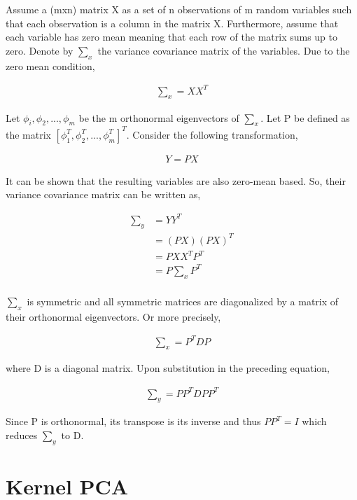 \documentclass[11pt, a4paper]{article}
\begin{document}
Assume a (mxn) matrix X as a set of n observations of m random variables such that each observation is a column in the matrix X. Furthermore, assume that each variable has zero mean meaning that each row of the matrix sums up to zero. Denote by $\sum_x$ the variance covariance matrix of the variables. Due to the zero mean condition, 

\begin{align*}
	\sum_x = XX^T 
\end{align*} 

Let $\phi_i, \phi_2, ..., \phi_m$ be the m orthonormal eigenvectors of $\sum_x$. Let P be defined as the matrix $[\phi_1^T, \phi_2^T, ..., \phi_m^T]^T$. Consider the following transformation, 

\begin{align*}
	Y = PX 
\end{align*}

It can be shown that the resulting variables are also zero-mean based. So, their variance covariance matrix can be written as,

\begin{align*}
	\sum_y & = YY^T       \\
	       & = (PX)(PX)^T \\
	       & = PXX^TP^T   \\
	       & = P\sum_xP^T \\           
\end{align*}

$\sum_x$ is symmetric and all symmetric matrices are diagonalized by a matrix of their orthonormal eigenvectors. Or more precisely,

\begin{align*}
	\sum_x = P^TDP 
\end{align*}

where D is a diagonal matrix. Upon substitution in the preceding equation,

\begin{align*}
	\sum_y = PP^TDPP^T 
\end{align*}

Since P is orthonormal, its transpose is its inverse and thus $PP^T = I$ which reduces $\sum_y$ to D.

\section{Kernel PCA}
\end{document}
